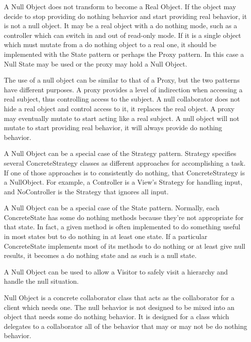 \documentclass{book}
\begin{document}
    A Null Object does not transform to become a Real Object. If the object may decide to stop providing do nothing behavior and start providing real behavior, it is not a null object.
    It may be a real object with a do nothing mode, such as a controller which can switch in and out of read-only mode.
    If it is a single object which must mutate from a do nothing object to a real one, it should be implemented with the State pattern or perhaps the Proxy pattern.
    In this case a Null State may be used or the proxy may hold a Null Object.

    The use of a null object can be similar to that of a Proxy, but the two patterns have different purposes.
    A proxy provides a level of indirection when accessing a real subject, thus controlling access to the subject.
    A null collaborator does not hide a real object and control access to it, it replaces the real object.
    A proxy may eventually mutate to start acting like a real subject.
    A null object will not mutate to start providing real behavior, it will always provide do nothing behavior.

    A Null Object can be a special case of the Strategy pattern. Strategy specifies several ConcreteStrategy classes as different approaches for accomplishing a task.
    If one of those approaches is to consistently do nothing, that ConcreteStrategy is a NullObject.
    For example, a Controller is a View's Strategy for handling input, and NoController is the Strategy that ignores all input.

    A Null Object can be a special case of the State pattern. Normally, each ConcreteState has some do nothing methods because they're not appropriate for that state.
    In fact, a given method is often implemented to do something useful in most states but to do nothing in at least one state.
    If a particular ConcreteState implements most of its methods to do nothing or at least give null results, it becomes a do nothing state and as such is a null state.

    A Null Object can be used to allow a Visitor to safely visit a hierarchy and handle the null situation.

    Null Object is a concrete collaborator class that acts as the collaborator for a client which needs one.
    The null behavior is not designed to be mixed into an object that needs some do nothing behavior.
    It is designed for a class which delegates to a collaborator all of the behavior that may or may not be do nothing behavior.
\end{document}
